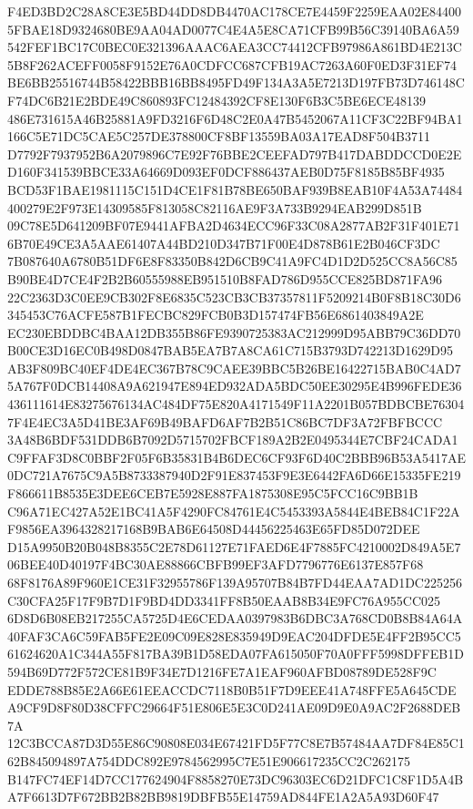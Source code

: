 \documentclass[UTF8,fontset=fandol,zihao=-4,a4paper]{ctexart}
\begin{document}
{{F4ED3BD2C28A8CE3E5BD44DD8DB4470AC178CE7E4459F2259EAA02E844005FBAE18D9324680BE9AA04AD0077C4E4A5E8CA71CFB99B56C39140BA6A59
542FEF1BC17C0BEC0E321396AAAC6AEA3CC74412CFB97986A861BD4E213C5B8F262ACEFF0058F9152E76A0CDFCC687CFB19AC7263A60F0ED3F31EF74
BE6BB25516744B58422BBB16BB8495FD49F134A3A5E7213D197FB73D746148CF74DC6B21E2BDE49C860893FC12484392CF8E130F6B3C5BE6ECE48139
486E731615A46B25881A9FD3216F6D48C2E0A47B5452067A11CF3C22BF94BA1166C5E71DC5CAE5C257DE378800CF8BF13559BA03A17EAD8F504B3711
D7792F7937952B6A2079896C7E92F76BBE2CEEFAD797B417DABDDCCD0E2ED160F341539BBCE33A64669D093EF0DCF886437AEB0D75F8185B85BF4935
BCD53F1BAE1981115C151D4CE1F81B78BE650BAF939B8EAB10F4A53A74484400279E2F973E14309585F813058C82116AE9F3A733B9294EAB299D851B
09C78E5D641209BF07E9441AFBA2D4634ECC96F33C08A2877AB2F31F401E716B70E49CE3A5AAE61407A44BD210D347B71F00E4D878B61E2B046CF3DC
7B087640A6780B51DF6E8F83350B842D6CB9C41A9FC4D1D2D525CC8A56C85B90BE4D7CE4F2B2B60555988EB951510B8FAD786D955CCE825BD871FA96
22C2363D3C0EE9CB302F8E6835C523CB3CB37357811F5209214B0F8B18C30D6345453C76ACFE587B1FECBC829FCB0B3D157474FB56E6861403849A2E
EC230EBDDBC4BAA12DB355B86FE9390725383AC212999D95ABB79C36DD70B00CE3D16EC0B498D0847BAB5EA7B7A8CA61C715B3793D742213D1629D95
AB3F809BC40EF4DE4EC367B78C9CAEE39BBC5B26BE16422715BAB0C4AD75A767F0DCB14408A9A621947E894ED932ADA5BDC50EE30295E4B996FEDE36
436111614E83275676134AC484DF75E820A4171549F11A2201B057BDBCBE763047F4E4EC3A5D41BE3AF69B49BAFD6AF7B2B51C86BC7DF3A72FBFBCCC
3A48B6BDF531DDB6B7092D5715702FBCF189A2B2E0495344E7CBF24CADA1C9FFAF3D8C0BBF2F05F6B35831B4B6DEC6CF93F6D40C2BBB96B53A5417AE
0DC721A7675C9A5B8733387940D2F91E837453F9E3E6442FA6D66E15335FE219F866611B8535E3DEE6CEB7E5928E887FA1875308E95C5FCC16C9BB1B
C96A71EC427A52E1BC41A5F4290FC84761E4C5453393A5844E4BEB84C1F22AF9856EA3964328217168B9BAB6E64508D44456225463E65FD85D072DEE
D15A9950B20B048B8355C2E78D61127E71FAED6E4F7885FC4210002D849A5E706BEE40D40197F4BC30AE88866CBFB99EF3AFD7796776E6137E857F68
68F8176A89F960E1CE31F32955786F139A95707B84B7FD44EAA7AD1DC225256C30CFA25F17F9B7D1F9BD4DD3341FF8B50EAAB8B34E9FC76A955CC025
6D8D6B08EB217255CA5725D4E6CEDAA0397983B6DBC3A768CD0B8B84A64A40FAF3CA6C59FAB5FE2E09C09E828E835949D9EAC204DFDE5E4FF2B95CC5
61624620A1C344A55F817BA39B1D58EDA07FA615050F70A0FFF5998DFFEB1D594B69D772F572CE81B9F34E7D1216FE7A1EAF960AFBD08789DE528F9C
EDDE788B85E2A66E61EEACCDC7118B0B51F7D9EEE41A748FFE5A645CDEA9CF9D8F80D38CFFC29664F51E806E5E3C0D241AE09D9E0A9AC2F2688DEB7A
12C3BCCA87D3D55E86C90808E034E67421FD5F77C8E7B57484AA7DF84E85C162B845094897A754DDC892E9784562995C7E51E906617235CC2C262175
B147FC74EF14D7CC177624904F8858270E73DC96303EC6D21DFC1C8F1D5A4BA7F6613D7F672BB2B82BB9819DBFB55E14759AD844FE1A2A5A93D60F47
}}
\end{document}
